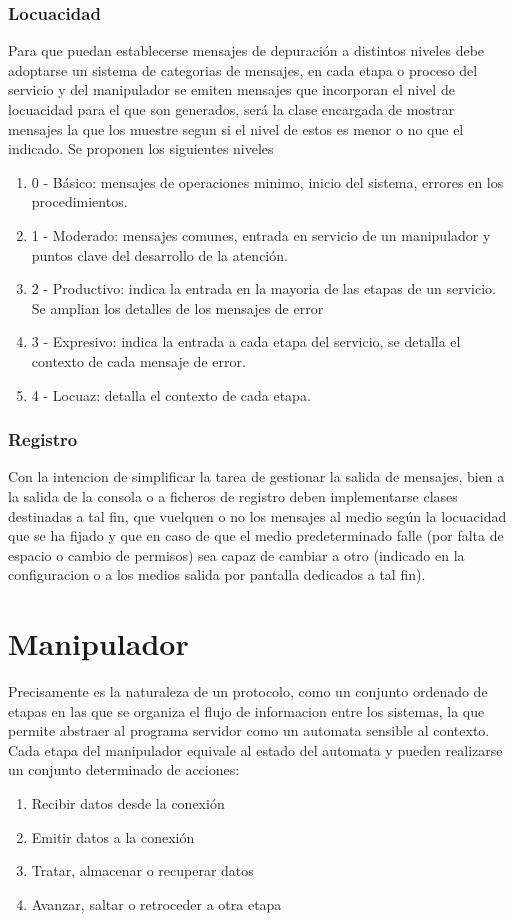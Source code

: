 \documentclass[a4paper,spanish,12pt]{book}
\begin{document}
\subsubsection{Locuacidad}
Para que puedan establecerse mensajes de depuración a distintos niveles debe adoptarse un sistema de categorias de mensajes, en cada etapa o proceso del servicio y del manipulador se emiten mensajes que incorporan el nivel de locuacidad para el que son generados, será la clase encargada de mostrar mensajes la que los muestre segun si el nivel de estos es menor o no que el indicado.
Se proponen los siguientes niveles
\begin{enumerate}
	\item 0 - Básico: mensajes de operaciones minimo, inicio del sistema, errores en los procedimientos.
	\item 1 - Moderado: mensajes comunes, entrada en servicio de un manipulador y puntos clave del desarrollo de la atención.
	\item 2 - Productivo: indica la entrada en la mayoria de las etapas de un servicio. Se amplian los detalles de los mensajes de error
	\item 3 - Expresivo: indica la entrada a cada etapa del servicio, se detalla el contexto de cada mensaje de error.
	\item 4 - Locuaz: detalla el contexto de cada etapa.
\end{enumerate}

\subsubsection{Registro}
Con la intencion de simplificar la tarea de gestionar la salida de mensajes, bien a la salida de la consola o a ficheros de registro deben implementarse clases destinadas a tal fin, que vuelquen o no los mensajes al medio según la locuacidad que se ha fijado y que en caso de que el medio predeterminado falle (por falta de espacio o cambio de permisos) sea capaz de cambiar a otro (indicado en la configuracion o a los medios salida por pantalla dedicados a tal fin).

\section{Manipulador}
Precisamente es la naturaleza de un protocolo, como un conjunto ordenado de etapas en las que se organiza el flujo de informacion entre los sistemas, la que permite abstraer al programa servidor como un automata sensible al contexto. Cada etapa del manipulador equivale al estado del automata y pueden realizarse un conjunto determinado de acciones:
\begin{enumerate}
	\item Recibir datos desde la conexión
	\item Emitir datos a la conexión
	\item Tratar, almacenar o recuperar datos
	\item Avanzar, saltar o retroceder a otra etapa
\end{enumerate}
\end{document}
